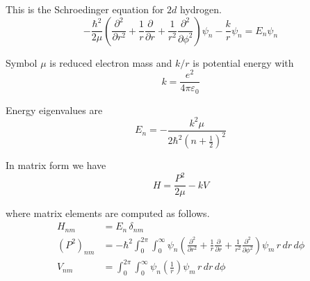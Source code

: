 \documentclass[12pt]{article}
\begin{document}
\noindent
This is the Schroedinger equation for $2d$ hydrogen.
\begin{equation*}
-\frac{\hbar^2}{2\mu}
\left(
\frac{\partial^2}{\partial r^2} +
\frac{1}{r}\frac{\partial}{\partial r}+
\frac{1}{r^2}\frac{\partial^2}{\partial\phi^2}
\right)\psi_n
-\frac{k}{r}\psi_n
=E_n\psi_n
\end{equation*}

\noindent
Symbol $\mu$ is reduced electron mass and $k/r$ is potential energy with
\begin{equation*}
k=\frac{e^2}{4\pi\varepsilon_0}
\end{equation*}

\noindent
Energy eigenvalues are
\begin{equation*}
E_n=-\frac{k^2\mu}{2\hbar^2\left(n+\tfrac{1}{2}\right)^2}
\end{equation*}

\noindent
In matrix form we have
\begin{equation*}
H=\frac{P^2}{2\mu}-kV
\end{equation*}

\noindent
where matrix elements are computed as follows.
\begin{align*}
H_{nm}&=E_n\,\delta_{nm}
\\[2ex]
\left(P^2\right)_{nm}&=-\hbar^2\int_0^{2\pi}\int_0^\infty
\psi_n
\left(
\frac{\partial^2}{\partial r^2} +
\frac{1}{r}\frac{\partial}{\partial r}+
\frac{1}{r^2}\frac{\partial^2}{\partial\phi^2}
\right)
\psi_m
\,r\,dr\,d\phi
\\[2ex]
V_{nm}&=\int_0^{2\pi}\int_0^\infty
\psi_n
\left(\frac{1}{r}\right)
\psi_m
\,r\,dr\,d\phi
\end{align*}
\end{document}
